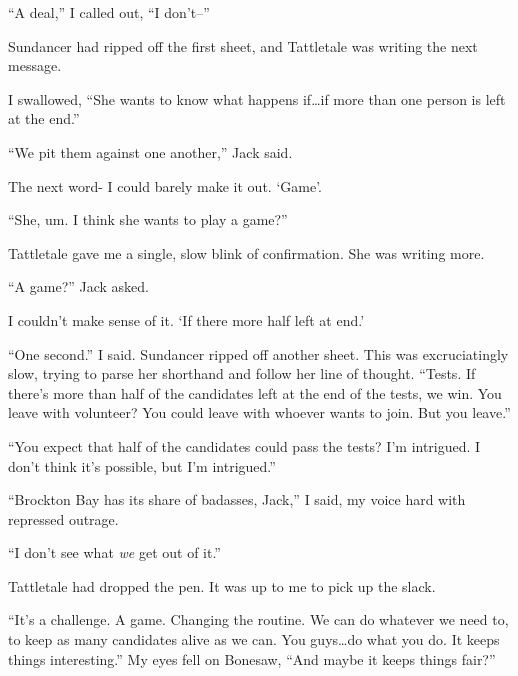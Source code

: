 ``A deal,'' I called out, ``I don't--''



Sundancer had ripped off the first sheet, and Tattletale was writing the next message.



I swallowed, ``She wants to know what happens if\ldots if more than one person is left at the end.''



``We pit them against one another,'' Jack said.



The next word- I could barely make it out.  `Game'.



``She, um.  I think she wants to play a game?''



Tattletale gave me a single, slow blink of confirmation.  She was writing more.



``A game?'' Jack asked.



I couldn't make sense of it.  `If there more half left at end.'



``One second.''  I said.  Sundancer ripped off another sheet.  This was excruciatingly slow, trying to parse her shorthand and follow her line of thought.  ``Tests.  If there's more than half of the candidates left at the end of the tests, we win.  You leave with volunteer?  You could leave with whoever wants to join.  But you leave.''



``You expect that half of the candidates could pass the tests?  I'm intrigued.  I don't think it's possible, but I'm intrigued.''



``Brockton Bay has its share of badasses, Jack,'' I said, my voice hard with repressed outrage.



``I don't see what \emph{we} get out of it.''



Tattletale had dropped the pen.  It was up to me to pick up the slack.



``It's a challenge.  A game.  Changing the routine.  We can do whatever we need to, to keep as many candidates alive as we can.  You guys\ldots do what you do.  It keeps things interesting.''  My eyes fell on Bonesaw, ``And maybe it keeps things fair?''



